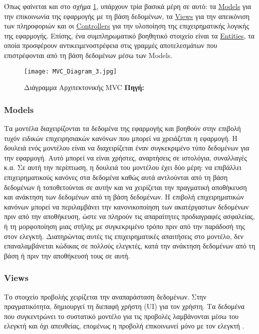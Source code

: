 Όπως φαίνεται και στο σχήμα \ref{fig:mvc-arch}, υπάρχουν τρία βασικά μέρη σε αυτό: τα \hyperref[thb:Models]{Models} για την επικοινωνία της εφαρμογής με τη βάση δεδομένων, τα \hyperref[thb:Views]{Views} για την απεικόνιση των πληροφοριών και οι \hyperref[thb:Controllers]{Controllers} για την υλοποίηση της επιχειρηματικής λογικής της εφαρμογής. Επίσης, ένα συμπληρωματικό βοηθητικό στοιχείο είναι τα \hyperref[thb:Entities]{Entities}, τα οποία προσφέρουν αντικειμενοστρέφεια στις γραμμές αποτελεσμάτων που επιστρέφονται από τη βάση δεδομένων μέσω των Models.

\begin{figure}[ht]
	\centering
	\texttt{[image: MVC\_Diagram\_3.jpg]}
	\caption[{Διάγραμμα Αρχιτεκτονικής MVC}]{Διάγραμμα Αρχιτεκτονικής MVC \textbf{Πηγή:} \cite{fig_MVC_Diagram_3}}
	\label{fig:mvc-arch}
\end{figure}

\subsubsection{Models} \label{thb:Models}
Τα μοντέλα διαχειρίζονται τα δεδομένα της εφαρμογής και βοηθούν στην επιβολή τυχόν ειδικών επιχειρησιακών κανόνων που μπορεί να χρειάζεται η εφαρμογή. Η δουλειά ενός μοντέλου είναι να διαχειρίζεται έναν συγκεκριμένο τύπο δεδομένων για την εφαρμογή. Αυτό μπορεί να είναι χρήστες, αναρτήσεις σε ιστολόγια, συναλλαγές κ.α. Σε αυτή την περίπτωση, η δουλειά του μοντέλου έχει δύο μέρη: να επιβάλλει επιχειρηματικούς κανόνες στα δεδομένα καθώς αυτά αντλούνται από τη βάση δεδομένων ή τοποθετούνται σε αυτήν και να χειρίζεται την πραγματική αποθήκευση και ανάκτηση των δεδομένων από τη βάση δεδομένων. Η επιβολή επιχειρηματικών κανόνων μπορεί να περιλαμβάνει την κανονικοποίηση των ακατέργαστων δεδομένων πριν από την αποθήκευση, ώστε να πληρούν τις απαραίτητες προδιαγραφές ασφαλείας, ή τη μορφοποίηση μιας στήλης με συγκεκριμένο τρόπο πριν από την παράδοσή της στον ελεγκτή. Διατηρώντας αυτές τις επιχειρηματικές απαιτήσεις στο μοντέλο, δεν επαναλαμβάνεται κώδικας σε πολλούς ελεγκτές, κατά την ανάκτηση δεδομένων από τη βάση ή πριν την αποθήκευσή τους σε αυτή.

\subsubsection{Views} \label{thb:Views}
Το στοιχείο προβολής χειρίζεται την αναπαράσταση δεδομένων. Στην πραγματικότητα, δημιουργεί τη διεπαφή χρήστη (UI) για τον χρήστη. Τα δεδομένα που συγκεντρώνει το συστατικό μοντέλο για τις προβολές λαμβάνονται μέσω του ελεγκτή και όχι απευθείας, επομένως η προβολή επικοινωνεί μόνο με τον ελεγκτή \cite{tutorials_2022}.

